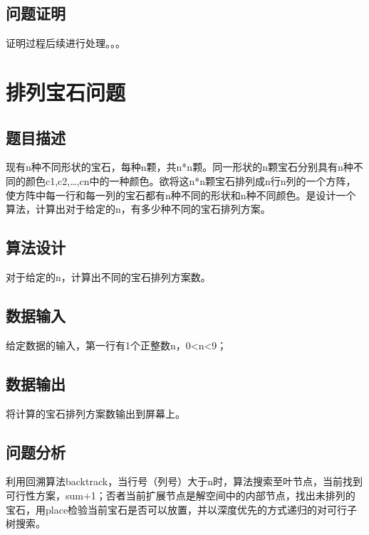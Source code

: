 \documentclass[UTF8]{ctexart}
\begin{document}
    \subsection{问题证明}
    证明过程后续进行处理。。。

    \section{排列宝石问题}
    \subsection{题目描述}
    现有n种不同形状的宝石，每种n颗，共n*n颗。同一形状的n颗宝石分别具有n种不同的颜色c1,c2,…,cn中的一种颜色。欲将这n*n颗宝石排列成n行n列的一个方阵，使方阵中每一行和每一列的宝石都有n种不同的形状和n种不同颜色。是设计一个算法，计算出对于给定的n，有多少种不同的宝石排列方案。
    \subsection{算法设计}
    对于给定的n，计算出不同的宝石排列方案数。
    \subsection{数据输入}
    给定数据的输入，第一行有1个正整数n，0<n<9；
    \subsection{数据输出}
    将计算的宝石排列方案数输出到屏幕上。
    \subsection{问题分析}
    利用回溯算法backtrack，当行号（列号）大于n时，算法搜索至叶节点，当前找到可行性方案，sum+1；否者当前扩展节点是解空间中的内部节点，找出未排列的宝石，用place检验当前宝石是否可以放置，并以深度优先的方式递归的对可行子树搜索。
\end{document}
